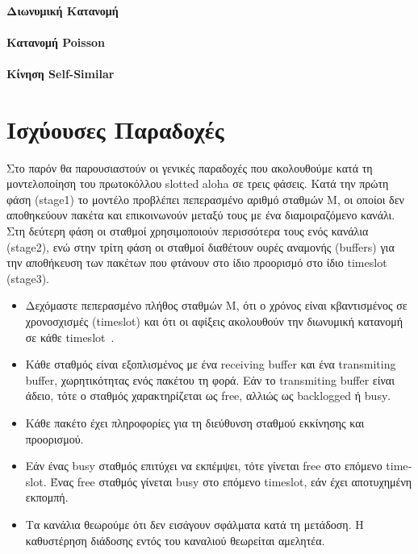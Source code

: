 \documentclass[12pt]{report}
\begin{document}
\paragraph{Διωνυμική Κατανομή}
\paragraph{Κατανομή \textlatin{Poisson}}
\paragraph{Κίνηση \textlatin{Self-Similar}}


\section{Ισχύουσες Παραδοχές}\label{sec2.1}
Στο παρόν θα παρουσιαστούν οι γενικές παραδοχές που ακολουθούμε κατά τη μοντελοποίηση του πρωτοκόλλου \textlatin{slotted aloha} σε τρεις φάσεις. Κατά την πρώτη φάση (\textlatin{stage1}) το μοντέλο προβλέπει πεπερασμένο αριθμό σταθμών \textlatin{M}, οι οποίοι δεν αποθηκεύουν πακέτα και επικοινωνούν μεταξύ τους με ένα διαμοιραζόμενο κανάλι. Στη δεύτερη φάση οι σταθμοί χρησιμοποιούν περισσότερα τους ενός κανάλια (\textlatin{stage2}), ενώ στην τρίτη φάση οι σταθμοί διαθέτουν ουρές αναμονής (\textlatin{buffers}) για την αποθήκευση των πακέτων που φτάνουν στο ίδιο προορισμό στο ίδιο \textlatin{timeslot} (\textlatin{stage3}).
\begin{itemize}
	\item Δεχόμαστε πεπερασμένο πλήθος σταθμών \textlatin{M}, ότι ο χρόνος είναι κβαντισμένος σε χρονοσχισμές (\textlatin{timeslot}) και ότι οι αφίξεις ακολουθούν την διωνυμική κατανομή σε κάθε \textlatin{timeslot}~\cite{book:01}. 
	\item Κάθε σταθμός είναι εξοπλισμένος με ένα \textlatin{receiving buffer} και ένα \textlatin{transmiting buffer}, χωρητικότητας ενός πακέτου τη φορά. Εάν το \textlatin{transmiting buffer} είναι άδειο, τότε ο σταθμός χαρακτηρίζεται ως \textlatin{free}, αλλιώς ως \textlatin{backlogged} ή \textlatin{busy}.
	\item Κάθε πακέτο έχει πληροφορίες για τη διεύθυνση σταθμού εκκίνησης και προορισμού.
	\item Εάν ένας \textlatin{busy} σταθμός επιτύχει να εκπέμψει, τότε γίνεται \textlatin{free} στο επόμενο \textlatin{timeslot}. Ένας \textlatin{free} σταθμός γίνεται \textlatin{busy} στο επόμενο \textlatin{timeslot}, εάν έχει αποτυχημένη εκπομπή.
	\item Τα κανάλια θεωρούμε ότι δεν εισάγουν σφάλματα κατά τη μετάδοση. Η καθυστέρηση διάδοσης εντός του καναλιού θεωρείται αμελητέα.
\end{itemize}
\end{document}
